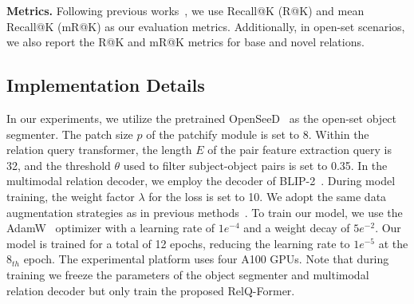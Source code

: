 \noindent \textbf{Metrics.}
Following previous works~\citep{yang2022panoptic, zhou2023hilo}, we use Recall@K (R@K) and mean Recall@K (mR@K) as our evaluation metrics.
Additionally, in open-set scenarios, we also report the R@K and mR@K metrics for base and novel relations.


\subsection{Implementation Details}
In our experiments, we utilize the pretrained OpenSeeD~\citep{zhang2023simple} as the open-set object segmenter.
The patch size $p$ of the patchify module is set to 8.
Within the relation query transformer, the length $E$ of the pair feature extraction query is 32, and the threshold $\theta$ used to filter subject-object pairs is set to 0.35.
In the multimodal relation decoder, we employ the decoder of BLIP-2~\citep{li2023blip}.
During model training, the weight factor $\lambda$ for the loss is set to 10.
We adopt the same data augmentation strategies as in previous methods~\citep{yang2022panoptic, zhou2023hilo}.
To train our model, we use the AdamW~\citep{loshchilov2017decoupled} optimizer with a learning rate of $1e^{-4}$ and a weight decay of $5e^{-2}$.
Our model is trained for a total of 12 epochs, reducing the learning rate to $1e^{-5}$ at the $8_{th}$ epoch.
The experimental platform uses four A100 GPUs.
Note that during training we freeze the parameters of the object segmenter and multimodal relation decoder but only train the proposed RelQ-Former.


